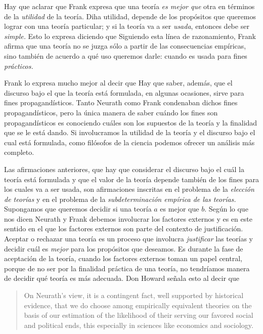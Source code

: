 Hay que aclarar que Frank expresa que una teoría \emph{es mejor que} otra en términos de la \emph{utilidad} de la teoría.
Diha utilidad, depende de los propósitos que queremos lograr con una teoría particular;
y si la teoría va a ser \emph{usada}, entonces debe ser \emph{simple.}
Esto lo expresa diciendo que  \parencite[p.~14]{Frank1956} Siguiendo esta línea de
razonamiento, Frank afirma que una teoría no se juzga sólo a partir de las
consecuencias empíricas, sino también de acuerdo a qué uso queremos darle:
cuando es usada para fines \emph{prácticos.}

Frank lo expresa mucho mejor al decir que  \parencite[p.~4]{Frank1956}
Hay que saber, además, que el discurso bajo el que la teoría está formulada, en algunas ocasiones, sirve para fines propagandísticos.
Tanto Neurath como Frank condenaban dichos fines propagandísticos, pero la única manera de saber cuándo los fines son propagandísticos es conociendo cuáles son los supuestos de la teoría y la finalidad que se le está dando.
Si involucramos la utilidad de la teoría y el discurso bajo el cual está formulada, como filósofos de la ciencia podemos ofrecer un análisis más completo.

Las afirmaciones anteriores, que hay que considerar el discurso bajo el cuál la teoría está formulada y que el valor de la teoría depende también de los fines para los cuales va a ser usada, son afirmaciones inscritas en el problema de la \emph{elección de teorías} y en el problema de la \emph{subdeterminación empírica de las teorías.}
Supongamos que queremos decidir si una teoría $a$ es mejor que $b$. 
Según lo que nos dicen Neurath y Frank debemos involucrar los factores externos y es en este sentido en el que los factores externos son parte del contexto de justificación.
Aceptar o rechazar una teoría es un proceso que involucra \emph{justificar} las teorías y decidir cuál es \emph{mejor} para los propósitos que deseamos.
Es durante la fase de aceptación de la teoría, cuando los factores externos toman un papel central, porque de no ser por la finalidad práctica de una teoría, no tendríamos manera de decidir qué teoría es más adecuada.
Don Howard señala esto al decir que 

	\begin{quote}
	
	On Neurath's view, it is a contingent fact, well supported by historical evidence, that we do choose among empirically equivalent theories on the basis of our estimation of the likelihood of their serving our favored social and political ends, this especially in sciences like economics and sociology. \parencite[p.~5]{Howard2006}
	
	\end{quote}

